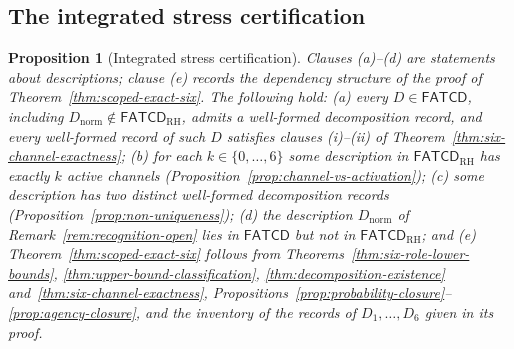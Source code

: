 \documentclass[11pt]{article}
\newtheorem{proposition}[theorem]{Proposition}
\theoremstyle{definition}
\newcommand{\FATCD}{\ensuremath{\mathsf{FATCD}}}
\begin{document}
\subsection{The integrated stress certification}\label{subsec:integrated-stress-theorem}

\begin{proposition}[Integrated stress certification]\label{thm:integrated-stress}
Clauses (a)--(d) are statements about descriptions; clause (e) records the
dependency structure of the proof of Theorem~\ref{thm:scoped-exact-six}.
The following hold:
(a) every \(D\in\FATCD{}\), including \(D_{\mathrm{norm}}\notin\FATCD_{\mathrm{RH}}\),
admits a well-formed decomposition record, and every well-formed record of such
\(D\) satisfies clauses (i)--(ii) of Theorem~\ref{thm:six-channel-exactness};
(b) for each \(k\in\{0,\dots,6\}\) some description in \(\FATCD_{\mathrm{RH}}\) has exactly
\(k\) active channels (Proposition~\ref{prop:channel-vs-activation});
(c) some description has two distinct well-formed decomposition records
(Proposition~\ref{prop:non-uniqueness});
(d) the description \(D_{\mathrm{norm}}\) of Remark~\ref{rem:recognition-open}
lies in \FATCD{} but not in \(\FATCD_{\mathrm{RH}}\); and
(e) Theorem~\ref{thm:scoped-exact-six} follows from
Theorems~\ref{thm:six-role-lower-bounds},
\ref{thm:upper-bound-classification}, \ref{thm:decomposition-existence}
and~\ref{thm:six-channel-exactness}, Propositions~\ref{prop:probability-closure}--\ref{prop:agency-closure},
and the inventory of the records of \(D_1,\ldots,D_6\) given in its proof.
\end{proposition}
\end{document}
